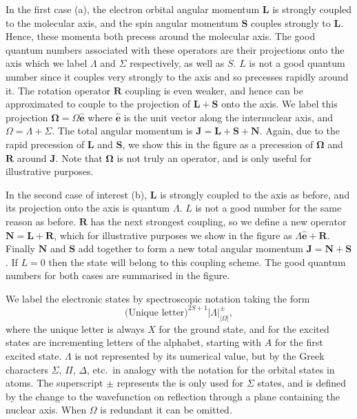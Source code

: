 In the first case (a), the electron orbital angular momentum $\mathbf{L}$ is
strongly coupled to the molecular axis, and the spin angular momentum
$\mathbf{S}$ couples strongly to $\mathbf{L}$. Hence, these momenta both
precess around the molecular axis. The good quantum numbers associated with
these operators are their projections onto the axis which we label $\Lambda$
and $\Sigma$  respectively, as well as $S$. $L$ is not a good quantum number
since it couples very strongly to the axis and so precesses rapidly around it.
%
The rotation operator $\mathbf{R}$ coupling is even weaker, and hence can be
approximated to couple to the projection of $\mathbf{L} + \mathbf{S}$ onto the
axis. We label this projection $\mathbf{\Omega} = \Omega \mathbf{\hat{e}}$
where $\mathbf{\hat{e}}$ is the unit vector along the internuclear axis, and $\Omega =
\Lambda + \Sigma$. The total angular momentum is $\mathbf{J} = \mathbf{L} +
\mathbf{S} + \mathbf{N}$. Again, due to the rapid precession of $\mathbf{L}$
and $\mathbf{S}$, we show this in the figure as a precession of
$\mathbf{\Omega}$ and $\mathbf{R}$ around $\mathbf{J}$. Note that
$\mathbf{\Omega}$ is not truly an operator, and is only useful for illustrative
purposes.

In the second case of interest (b), $\mathbf{L}$ is strongly coupled to the
axis as before, and its projection onto the axis is quantum $\Lambda$. $L$ is
not a good number for the same reason as before.  $\mathbf{R}$ has the next
strongest coupling, so we define a new operator $\mathbf{N} = \mathbf{L} +
\mathbf{R}$, which for illustrative purposes we show in the figure as $\Lambda
\mathbf{\hat{e}} + \mathbf{R}$. Finally $\mathbf{N}$ and $\mathbf{S}$ add
together to form a new total angular momentum $\mathbf{J} = \mathbf{N} +
\mathbf{S}$. If $L=0$ then the state will belong to this coupling scheme. The
good quantum numbers for both cases are summarised in the figure. 

We label the electronic states by spectroscopic notation taking the form
%
\begin{equation*} 
  \text{(Unique letter)}^{2S+1}|\Lambda|^\pm_{|\Omega|},
\end{equation*}
%
where the unique letter is always $X$ for the ground state, and for the excited
states are 
incrementing letters of the alphabet, starting with $A$ for the first
excited state. $\Lambda$ is not represented by its numerical value, but
by the Greek characters $\Sigma$, $\Pi$, $\Delta$, etc.\ in analogy with the
notation for the orbital states in atoms. The superscript $\pm$ represents the
is only used for $\Sigma$ states, and is defined by the change to
the wavefunction on reflection through a plane containing the nuclear axis.
When $\Omega$ is redundant it can be omitted.

